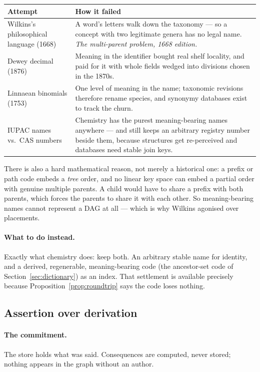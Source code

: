 \begin{center}\small
\begin{tabularx}{\textwidth}{@{}p{4.1cm} X@{}}
\toprule
\textbf{Attempt} & \textbf{How it failed}\\
\midrule
Wilkins's philosophical language (1668) \citep{wilkins1668}
  & A word's letters walk down the taxonomy --- so a concept with two
    legitimate genera has no legal name. \emph{The multi-parent problem,
    1668 edition.}\\
Dewey decimal (1876)
  & Meaning in the identifier bought real shelf locality, and paid for it with
    whole fields wedged into divisions chosen in the 1870s.\\
Linnaean binomials (1753)
  & One level of meaning in the name; taxonomic revisions therefore rename
    species, and synonymy databases exist to track the churn.\\
IUPAC names vs.\ CAS numbers
  & Chemistry has the purest meaning-bearing names anywhere --- and still
    keeps an arbitrary registry number beside them, because structures get
    re-perceived and databases need stable join keys.\\
\bottomrule
\end{tabularx}
\end{center}

There is also a hard mathematical reason, not merely a historical one: a
prefix or path code embeds a \emph{tree} order, and no linear key space can
embed a partial order with genuine multiple parents. A child would have to
share a prefix with both parents, which forces the parents to share it with
each other. So meaning-bearing names cannot represent a DAG at all --- which
is why Wilkins agonised over placements.

\paragraph{What to do instead.} Exactly what chemistry does: keep both. An
arbitrary stable name for identity, and a derived, regenerable, meaning-bearing
code (the ancestor-set code of Section~\ref{sec:dictionary}) as an index. That
settlement is available precisely because Proposition~\ref{prop:roundtrip}
says the code loses nothing.

\subsection{Assertion over derivation}

\paragraph{The commitment.} The store holds what was said. Consequences are
computed, never stored; nothing appears in the graph without an author.

